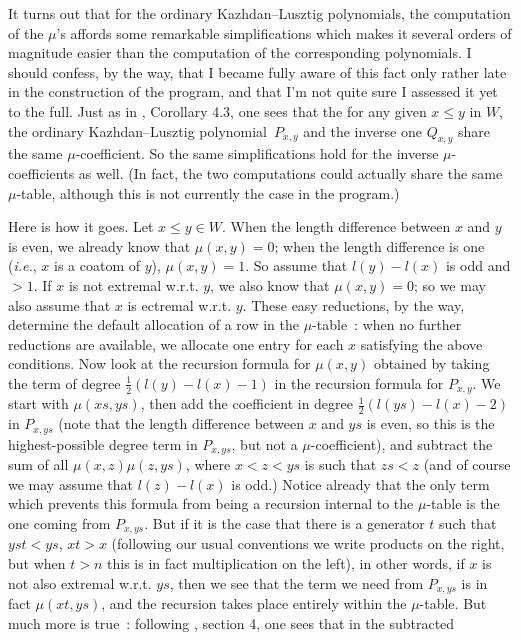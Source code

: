 \documentclass[11pt]{article}
\newcommand{\ds}{\displaystyle}
\newcommand{\klpol}{Kazh\-dan--Lusz\-tig po\-ly\-no\-mial}
\begin{document}
It turns out that for the ordinary \klpol s, the computation of the $\mu$'s
affords some remarkable simplifications which makes it several orders of
magnitude easier than the computation of the corresponding polynomials. I
should confess, by the way, that I became fully aware of this fact only
rather late in the construction of the program, and that I'm not quite sure
I assessed it yet to the full. Just as in \cite{kl:1979}, Corollary 4.3,
one sees that the for any given $x\leq y$ in $W$, the ordinary \klpol\
$P_{x,y}$ and the inverse one $Q_{x,y}$ share the same $\mu$-coefficient.
So the same simplifications hold for the inverse $\mu$-coefficients as well.
(In fact, the two computations could actually share the same $\mu$-table,
although this is not currently the case in the program.)

Here is how it goes. Let $x\leq y\in W$. When the length difference between
$x$ and $y$ is even, we already know that $\mu(x,y)=0$; when the length
difference is one ({\em i.e.}, $x$ is a coatom of $y$), $\mu(x,y)=1$. So
assume that $l(y)-l(x)$ is odd and $>1$. If $x$ is not extremal w.r.t. $y$,
we also know that $\mu(x,y)=0$; so we may also assume that $x$ is ectremal
w.r.t. $y$. These easy reductions, by the way, determine the default
allocation of a row in the $\mu$-table~: when no further reductions are
available, we allocate one entry for each $x$ satisfying the above conditions.
Now look at the recursion formula for $\mu(x,y)$ obtained by taking the term
of degree $\ds{\frac{1}{2}(l(y)-l(x)-1)}$ in the recursion formula for
$P_{x,y}$. We start with $\mu(xs,ys)$, then add the coefficient in degree
$\ds{\frac{1}{2}(l(ys)-l(x)-2)}$ in $P_{x,ys}$ (note that the length difference
between $x$ and $ys$ is even, so this is the highest-possible degree term in
$P_{x,ys}$, but not a $\mu$-coefficient), and subtract the sum of all
$\mu(x,z)\mu(z,ys)$, where $x<z<ys$ is such that $zs<z$ (and of course we
may assume that $l(z)-l(x)$ is odd.) Notice already that the only term which
prevents this formula from being a recursion internal to the $\mu$-table is
the one coming from $P_{x,ys}$. But if it is the case that there is a generator
$t$ such that $yst<ys$, $xt>x$ (following our usual conventions we write
products on the right, but when $t>n$ this is in fact multiplication on the
left), in other words, if $x$ is not also extremal w.r.t. $ys$, then we see
that the term we need from $P_{x,ys}$ is in fact $\mu(xt,ys)$, and
the recursion takes place entirely within the $\mu$-table. But much more is
true~: following \cite{kl:1979}, section 4, one sees that in the subtracted
\end{document}
